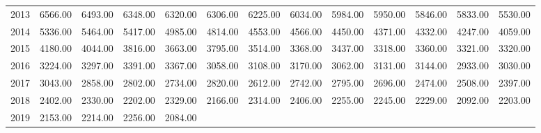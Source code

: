\begin{longtable}{rrrrrrrrrrrrr}
  2013 & 6566.00 & 6493.00 & 6348.00 & 6320.00 & 6306.00 & 6225.00 & 6034.00 & 5984.00 & 5950.00 & 5846.00 & 5833.00 & 5530.00 \\ 
  2014 & 5336.00 & 5464.00 & 5417.00 & 4985.00 & 4814.00 & 4553.00 & 4566.00 & 4450.00 & 4371.00 & 4332.00 & 4247.00 & 4059.00 \\ 
  2015 & 4180.00 & 4044.00 & 3816.00 & 3663.00 & 3795.00 & 3514.00 & 3368.00 & 3437.00 & 3318.00 & 3360.00 & 3321.00 & 3320.00 \\ 
  2016 & 3224.00 & 3297.00 & 3391.00 & 3367.00 & 3058.00 & 3108.00 & 3170.00 & 3062.00 & 3131.00 & 3144.00 & 2933.00 & 3030.00 \\ 
  2017 & 3043.00 & 2858.00 & 2802.00 & 2734.00 & 2820.00 & 2612.00 & 2742.00 & 2795.00 & 2696.00 & 2474.00 & 2508.00 & 2397.00 \\ 
  2018 & 2402.00 & 2330.00 & 2202.00 & 2329.00 & 2166.00 & 2314.00 & 2406.00 & 2255.00 & 2245.00 & 2229.00 & 2092.00 & 2203.00 \\ 
  2019 & 2153.00 & 2214.00 & 2256.00 & 2084.00 &  &  &  &  &  &  &  &  \\ 
   \hline
\hline
\end{longtable}
